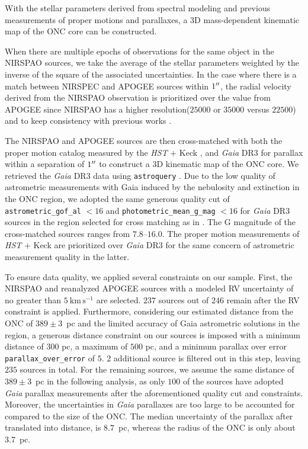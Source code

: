 \documentclass[12pt]{ucsddissertation}
\begin{document}
\begin{CJK*}{UTF8}{gbsn}
With the stellar parameters derived from spectral modeling and previous measurements of proper motions and parallaxes, a 3D mass-dependent kinematic map of the ONC core can be constructed. 

When there are multiple epochs of observations for the same object in the NIRSPAO sources, we take the average of the stellar parameters weighted by the inverse of the square of the associated uncertainties. In the case where there is a match between NIRSPEC and APOGEE sources within $1\mbox{$^{\prime\prime}$}$, the radial velocity derived from the NIRSPAO observation is prioritized over the value from APOGEE since NIRSPAO has a higher resolution($25000$ or $35000$ versus $22500$) and to keep consistency with previous works .

The NIRSPAO and APOGEE sources are then cross-matched with both the proper motion catalog measured by the \textit{HST} + Keck , and \textit{Gaia} DR3 \citep[][]{Gaia-2016, GaiaDR3-2023j} for parallax within a separation of $1\mbox{$^{\prime\prime}$}$ to construct a 3D kinematic map of the ONC core. We retrieved the \textit{Gaia} DR3 data using \texttt{astroquery} \citep[][]{astroquery}. Due to the low quality of astrometric measurements with Gaia induced by the nebulosity and extinction in the ONC region, we adopted the same generous quality cut of \texttt{astrometric\_gof\_al} $ < 16$ and \texttt{photometric\_mean\_g\_mag} $ < 16$ for \textit{Gaia} DR3 sources in the region selected for cross matching as in . The G magnitude of the cross-matched sources ranges from $7.8$--$16.0$. The proper motion measurements of \textit{HST} + Keck are prioritized over \textit{Gaia} DR3 for the same concern of astrometric measurement quality in the latter.

To ensure data quality, we applied several constraints on our sample. First, the NIRSPAO and reanalyzed APOGEE sources with a modeled RV uncertainty of no greater than $5~\mathrm{km}\,\mathrm{s}^{-1}$ are selected. $237$ sources out of $246$ remain after the RV constraint is applied. Furthermore, considering our estimated distance from the ONC of $389\pm3$~pc \citep[][]{Kounkel-2018} and the limited accuracy of Gaia astrometric solutions in the region, a generous distance constraint on our sources is imposed with a minimum distance of $300$ pc, a maximum of $500$ pc, and a minimum parallax over error \texttt{parallax\_over\_error} of $5$. $2$ additional source is filtered out in this step, leaving $235$ sources in total. For the remaining sources, we assume the same distance of $389\pm3$~pc \citet{Kounkel-2018} in the following analysis, as only $100$ of the sources have adopted \textit{Gaia} parallax measurements after the aforementioned quality cut and constraints. Moreover, the uncertainties in \textit{Gaia} parallaxes are too large to be accounted for compared to the size of the ONC. The median uncertainty of the parallax after translated into distance, is $8.7$~pc, whereas the radius of the ONC is only about $3.7$~pc.


\end{CJK*}
\end{document}
